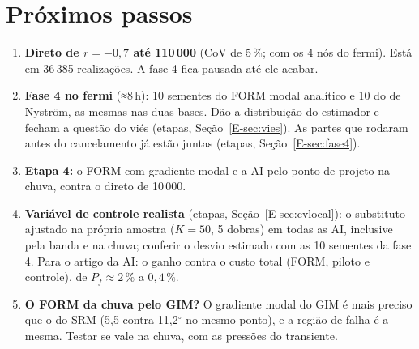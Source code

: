 \documentclass[11pt,a4paper]{article}
\begin{document}
\section{Próximos passos}
\begin{enumerate}
  \item \textbf{Direto de $r = -0{,}7$ até 110\,000} (CoV de 5\,\%; com os 4 nós do fermi). Está em 36\,385 realizações. A fase 4 fica pausada até ele acabar.
  \item \textbf{Fase 4 no fermi} (≈8\,h): 10 sementes do FORM modal analítico e 10 do de Nyström, as mesmas nas duas
    bases. Dão a distribuição do estimador e fecham a questão do viés (etapas, Seção~\ref{E-sec:vies}). As partes que
    rodaram antes do cancelamento já estão juntas (etapas, Seção~\ref{E-sec:fase4}).
  \item \textbf{Etapa 4:} o FORM com gradiente modal e a AI pelo ponto de projeto na chuva, contra o direto de
    10\,000.
  \item \textbf{Variável de controle realista} (etapas, Seção~\ref{E-sec:cvlocal}): o substituto ajustado na própria
    amostra ($K = 50$, 5 dobras) em todas as AI, inclusive pela banda e na chuva; conferir o desvio estimado com as 10
    sementes da fase 4. Para o artigo da AI: o ganho contra o custo total (FORM, piloto e controle), de
    $P_f \approx 2\,\%$ a $0{,}4\,\%$.
  \item \textbf{O FORM da chuva pelo GIM?} O gradiente modal do GIM é mais preciso que o do SRM (5{,}5 contra 11{,}2$^\circ$ no mesmo ponto), e a região de
    falha é a mesma. Testar se vale na chuva, com as pressões do transiente.
\end{enumerate}
\end{document}
